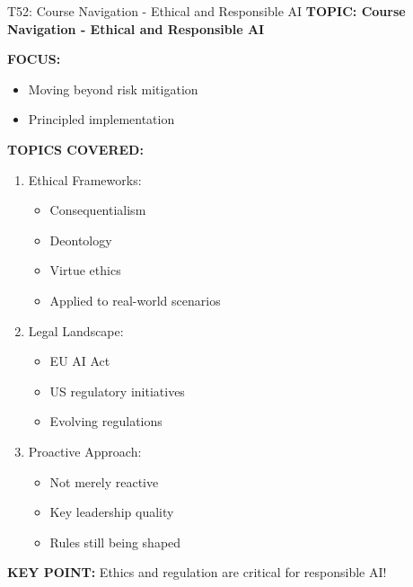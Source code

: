 \documentclass[8pt]{beamer}
\begin{document}
	\begin{frame}{T52: Course Navigation - Ethical and Responsible AI}
		\fontsize{6.5}{7.5}\selectfont
		\textbf{TOPIC: Course Navigation - Ethical and Responsible AI}
		
		\vspace{0.1cm}
		\textbf{FOCUS:}
		\begin{itemize}
			\item Moving beyond risk mitigation
			\item Principled implementation
		\end{itemize}
		
		\vspace{0.1cm}
		\textbf{TOPICS COVERED:}
		\begin{enumerate}
			\item \textcolor{myblue}{Ethical Frameworks:}
			\begin{itemize}
				\item Consequentialism
				\item Deontology
				\item Virtue ethics
				\item Applied to real-world scenarios
			\end{itemize}
			\item \textcolor{myblue}{Legal Landscape:}
			\begin{itemize}
				\item EU AI Act
				\item US regulatory initiatives
				\item Evolving regulations
			\end{itemize}
			\item \textcolor{myblue}{Proactive Approach:}
			\begin{itemize}
				\item Not merely reactive
				\item Key leadership quality
				\item Rules still being shaped
			\end{itemize}
		\end{enumerate}
		
		\textcolor{myred}{\textbf{KEY POINT:}} Ethics and regulation are \textcolor{myblue}{critical for responsible AI}!
	\end{frame}
	
\end{document}
